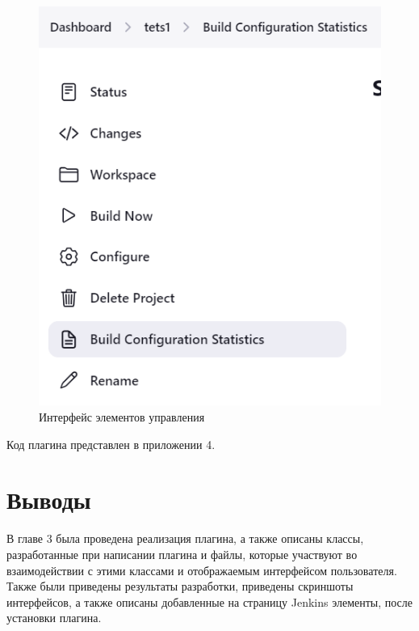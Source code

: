 \begin{figure}[ht!] 
	\center
	\includegraphics [scale=0.47] {my_folder/images//ui3}
	\caption{Интерфейс элементов управления} 
	\label{fig:ArchitectureJenkins}  
\end{figure}


Код плагина представлен в приложении 4.
 
\section{Выводы} \label{ch3:sec3}

В главе 3 была проведена реализация плагина, а также описаны классы, разработанные при написании плагина и файлы, которые участвуют во взаимодействии с этими классами и отображаемым интерфейсом пользователя. Также были приведены результаты разработки, приведены скриншоты интерфейсов, а также описаны добавленные на страницу Jenkins элементы, после установки плагина.





%
%

